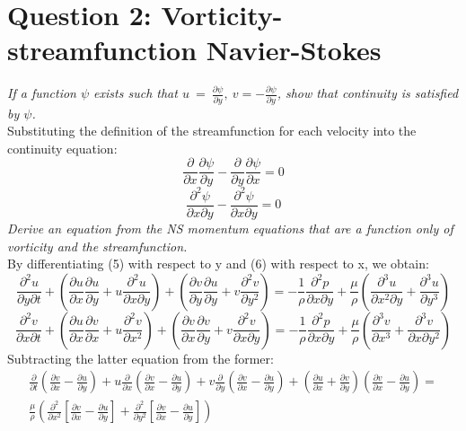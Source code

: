 \documentclass{article}
\begin{document}
\section{Question 2: Vorticity-streamfunction Navier-Stokes}\label{sec:Q2}
\textit{If a function $\psi$ exists such that $u\  =\  \frac{\partial \psi }{\partial y} ,\  v=-\frac{\partial \psi }{\partial y} $, show that continuity is satisfied by $\psi$.} \\
Substituting the definition of the streamfunction for each velocity into the continuity equation:
$$\frac{\partial }{\partial x} \frac{\partial \psi }{\partial y} -\frac{\partial }{\partial y} \frac{\partial \psi }{\partial x} =0$$
$$\frac{\partial^{2} \psi }{\partial x\partial y} -\frac{\partial^{2} \psi }{\partial x\partial y} =0$$
\textit{Derive an equation from the NS momentum equations that are a function only of vorticity and the streamfunction.} \\
By differentiating (5) with respect to y and (6) with respect to x, we obtain:
$$\frac{\partial^{2} u}{\partial y\partial t} +\left( \frac{\partial u}{\partial x} \frac{\partial u}{\partial y} +u\frac{\partial^{2} u}{\partial x\partial y} \right)  +\left( \frac{\partial v}{\partial y} \frac{\partial u}{\partial y} +v\frac{\partial^{2} v}{\partial y^{2}} \right)  =-\frac{1}{\rho } \frac{\partial^{2} p}{\partial x\partial y} +\frac{\mu }{\rho } \left( \frac{\partial^{3{}} u}{\partial x^{2}\partial y} +\frac{\partial^{3} u}{\partial y^{3}} \right)   $$
$$\frac{\partial^{2} v}{\partial x\partial t} +\left( \frac{\partial u}{\partial x} \frac{\partial v}{\partial x} +u\frac{\partial^{2} v}{\partial x^{2}} \right)  +\left( \frac{\partial v}{\partial x} \frac{\partial v}{\partial y} +v\frac{\partial^{2} v}{\partial x\partial y} \right)  =-\frac{1}{\rho } \frac{\partial^{2} p}{\partial x\partial y} +\frac{\mu }{\rho } \left( \frac{\partial^{3{}} v}{\partial x^{3}} +\frac{\partial^{3} v}{\partial x\partial y^{2}} \right)   $$
Subtracting the latter equation from the former:
\begin{equation*}
\begin{aligned}
\frac{\partial }{\partial t} \left( \frac{\partial v}{\partial x} -\frac{\partial u}{\partial y} \right)  +u\frac{\partial }{\partial x} \left( \frac{\partial v}{\partial x} -\frac{\partial u}{\partial y} \right)  +v\frac{\partial }{\partial y} \left( \frac{\partial v}{\partial x} -\frac{\partial u}{\partial y} \right)  +\left( \frac{\partial u}{\partial x} +\frac{\partial v}{\partial y} \right)  \left( \frac{\partial v}{\partial x} -\frac{\partial u}{\partial y} \right)  =\\ \frac{\mu }{\rho } \left( \frac{\partial^{2} }{\partial x^{2}} \left[ \frac{\partial v}{\partial x} -\frac{\partial u}{\partial y} \right]  +\frac{\partial^{2} }{\partial y^{2}} \left[ \frac{\partial v}{\partial x} -\frac{\partial u}{\partial y} \right]  \right) 
\end{aligned}
\end{equation*}
\end{document}
